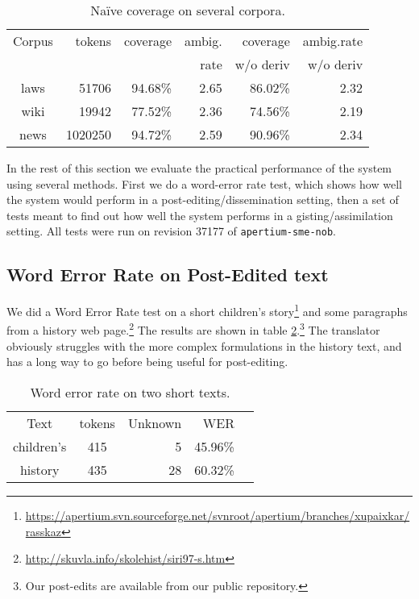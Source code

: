 \begin{table}
  \begin{center}
  \begin{tabular}{crrrrr}
   Corpus     & tokens   & coverage & ambig.      & coverage   & ambig.rate  \\
              &          &          & rate        & w/o deriv  & w/o deriv \\
   laws       &  51706   & 94.68\%  & 2.65        & 86.02\%    & 2.32 \\
   wiki       & 19942    & 77.52\%  & 2.36        & 74.56\%    & 2.19 \\
   news       & 1020250  & 94.72\%  & 2.59        & 90.96\%    & 2.34 \\
  \end{tabular}
    \caption{Na\"{i}ve coverage on several corpora.}
    \label{table:cov}
  \end{center}
\end{table}
In the rest of this section we evaluate the practical performance of
the system using several methods. First we do a word-error rate test,
which shows how well the system would perform in a
post-editing/dissemination setting, then a set of tests meant to find
out how well the system performs in a gisting/assimilation setting.
All tests were run on revision 37177 of \texttt{apertium-sme-nob}.



\subsection{Word Error Rate on Post-Edited text}
\label{sec:WER}
We did a Word Error Rate test on a short children's
story\footnote{\href{https://apertium.svn.sourceforge.net/svnroot/apertium/branches/xupaixkar/rasskaz}{https://apertium.svn.sourceforge.net/svnroot/apertium/branches/xupaixkar/rasskaz}}
and some paragraphs from a history web
page.\footnote{\href{http://skuvla.info/skolehist/siri97-s.htm}{http://skuvla.info/skolehist/siri97-s.htm}}
The results are shown in table \ref{table:wer}.\footnote{Our post-edits
  are available from our public repository.} The translator obviously
struggles with the more complex formulations in the history text, and
has a long way to go before being useful for post-editing.


\begin{table}
  \begin{center}
  \begin{tabular}{ccrrr}
   Text       & tokens & Unknown & WER  \\
   children's & 415     & 5      & 45.96\% \\
   history    & 435     & 28     & 60.32\%  \\
  \end{tabular}
    \caption{Word error rate on two short texts.}
    \label{table:wer}
  \end{center}
\end{table}


